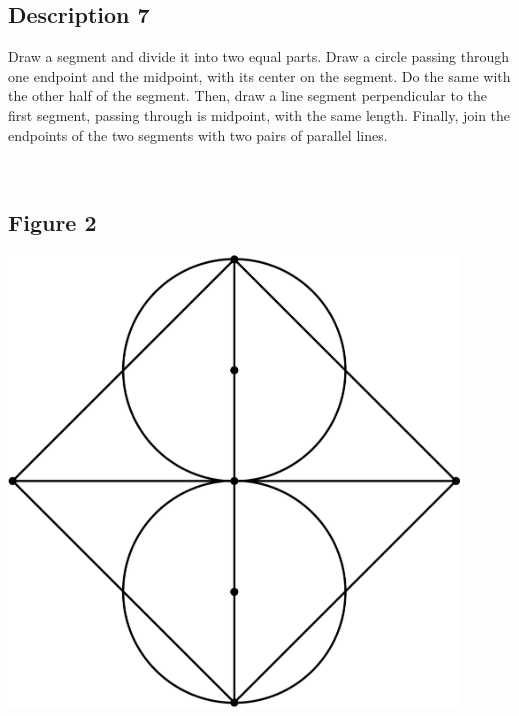 \documentclass[12pt,a4paper,article,english,firamath]{nsi}
\begin{document}
\maketitle

\subsection*{Description 7}
{\brettley 

Draw a segment and divide it into two equal parts. Draw a circle passing through one endpoint and the midpoint, with its
center on the segment. Do the same with the other half of the segment. Then, draw a line segment perpendicular to the
first segment, passing through is midpoint, with the same length. Finally, join the endpoints of the two segments with
two pairs of parallel lines.}\\[1em]



\subsection*{Figure 2}
\begin{center}
    \includegraphics[height=12cm]{img/fig07.png}
\end{center}
\end{document}

